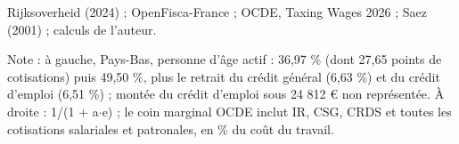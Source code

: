 Rijksoverheid (2024) ; OpenFisca-France ; OCDE, Taxing Wages 2026 ; Saez (2001) ; calculs de l'auteur.\par Note : à gauche, Pays-Bas, personne d'âge actif : 36,97 \% (dont 27,65 points de cotisations) puis 49,50 \%, plus le retrait du crédit général (6,63 \%) et du crédit d'emploi (6,51 \%) ; montée du crédit d'emploi sous 24 812 \euro{} non représentée. À droite : 1/(1 + a$\cdot$e) ; le coin marginal OCDE inclut IR, CSG, CRDS et toutes les cotisations salariales et patronales, en \% du coût du travail.
